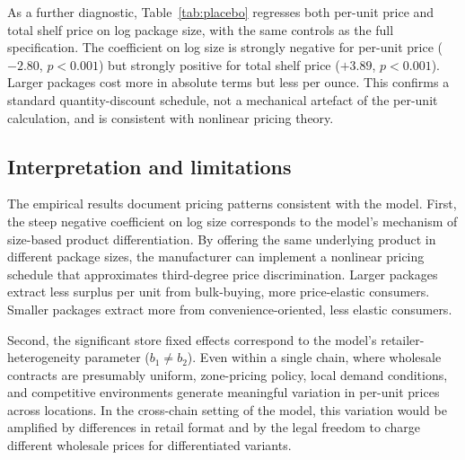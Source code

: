 \documentclass[12pt]{article}
\theoremstyle{definition}
\begin{document}
As a further diagnostic, Table~\ref{tab:placebo} regresses both per-unit price and total shelf price on log package size, with the same controls as the full specification. The coefficient on log size is strongly negative for per-unit price ($-2.80$, $p < 0.001$) but strongly positive for total shelf price ($+3.89$, $p < 0.001$). Larger packages cost more in absolute terms but less per ounce. This confirms a standard quantity-discount schedule, not a mechanical artefact of the per-unit calculation, and is consistent with nonlinear pricing theory.



\subsection{Interpretation and limitations}

The empirical results document pricing patterns consistent with the model.
First, the steep negative coefficient on log size corresponds to the model's mechanism of size-based product differentiation. By offering the same underlying product in different package sizes, the manufacturer can implement a nonlinear pricing schedule that approximates third-degree price discrimination.
Larger packages extract less surplus per unit from bulk-buying, more price-elastic consumers. Smaller packages extract more from convenience-oriented, less elastic consumers.

Second, the significant store fixed effects correspond to the model's retailer-heterogeneity parameter ($b_1 \ne b_2$).
Even within a single chain, where wholesale contracts are presumably uniform, zone-pricing policy, local demand conditions, and competitive environments generate meaningful variation in per-unit prices across locations.
In the cross-chain setting of the model, this variation would be amplified by differences in retail format and by the legal freedom to charge different wholesale prices for differentiated variants.
\end{document}

